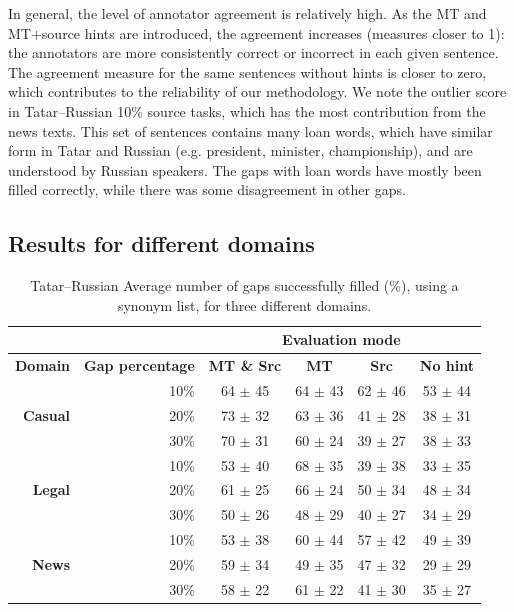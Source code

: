 \documentclass[11pt]{article}
\newcommand{\comment}[1]{}
\begin{document}
In general, the level of annotator agreement is relatively high. As the MT and MT+source hints are introduced, the agreement increases (measures closer to 1): the annotators are more consistently correct or incorrect in each given sentence. The agreement measure for the same sentences without hints is closer to zero, which contributes to the reliability of our methodology. We note the outlier score in Tatar--Russian 10\% source tasks, which has the most contribution from the news texts. \comment{EA: this Alpha is from a table we do not report here, I added a couple of words to clarify}This set of sentences contains many loan words, which have similar form in Tatar and Russian (e.g. president, minister, championship), and are understood by Russian speakers. The gaps with loan words have mostly been filled correctly, while there was some disagreement in other gaps.

\subsection{Results for different domains}
\begin{table}
\centering
\begin{tabular}{|r|r |*{4}{c}|}
\hline
\multicolumn{2}{|c|}{} &\multicolumn{4}{c|}{\textbf{Evaluation mode}}\\
\hline
\textbf{Domain} & \textbf{Gap percentage} & \textbf{MT \& Src} & \textbf{MT} & \textbf{Src} & \textbf{No hint} \\
\hline
 \multirow{3}{*}{\textbf{Casual}} &
10\%&64 \(\pm\) 45&64 \(\pm\) 43&62 \(\pm\) 46&53 \(\pm\) 44\\
& 20\%&73 \(\pm\) 32&63 \(\pm\) 36&41 \(\pm\) 28&38 \(\pm\) 31\\
& 30\%&70 \(\pm\) 31&60 \(\pm\) 24&39 \(\pm\) 27&38 \(\pm\) 33\\
\hline
 \multirow{3}{*}{\textbf{Legal}} &
10\%&53 \(\pm\) 40&68 \(\pm\) 35&39 \(\pm\) 38&33 \(\pm\) 35\\
&20\%&61 \(\pm\) 25&66 \(\pm\) 24&50 \(\pm\) 34&48 \(\pm\) 34\\
&30\%&50 \(\pm\) 26&48 \(\pm\) 29&40 \(\pm\) 27&34 \(\pm\) 29\\
\hline
 \multirow{3}{*}{\textbf{News}} &
10\%&53 \(\pm\) 38&60 \(\pm\) 44&57 \(\pm\) 42&49 \(\pm\) 39\\
&20\%&59 \(\pm\) 34&49 \(\pm\) 35&47 \(\pm\) 32&29 \(\pm\) 29\\
&30\%&58 \(\pm\) 22&61 \(\pm\) 22&41 \(\pm\) 30&35 \(\pm\) 27\\
\hline

\end{tabular}
\caption{Tatar--Russian Average number of gaps successfully filled (\%), using a synonym list, for three different domains.} 
\label{table:rus} 
\end{table}
\end{document}
